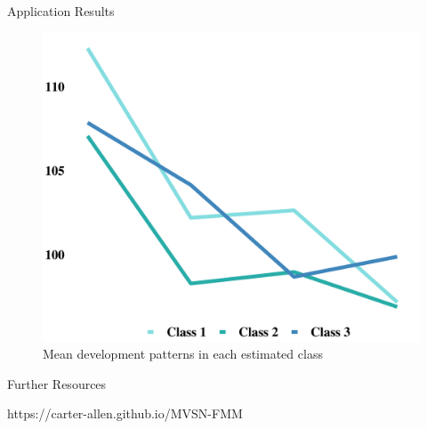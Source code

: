 \documentclass[final]{beamer}
\newlength{\onecolwid}
\begin{document}
\begin{frame}[t]
\begin{columns}[t]
\begin{column}{\onecolwid}
\begin{block}{Application Results}
\begin{figure}
\includegraphics[height=0.8\linewidth,width=1\linewidth]{clust_trends.pdf}
\caption{Mean development patterns in each estimated class}
\end{figure}

\end{block}










\begin{alertblock}{Further Resources}

\centering
https://carter-allen.github.io/MVSN-FMM

\end{alertblock}


\end{column}
\end{columns}
\end{frame}
\end{document}

